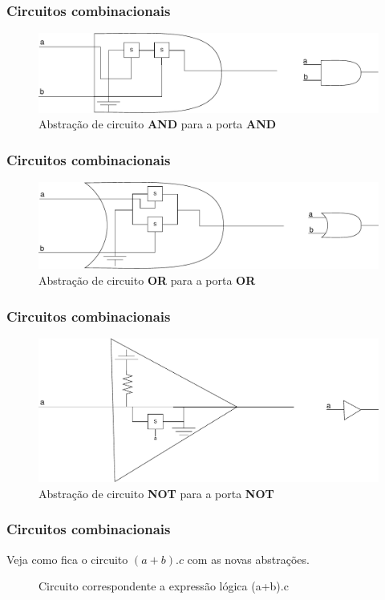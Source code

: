 \begin{frame}
	\frametitle{Circuitos combinacionais}
	\begin{figure}
		\centering
		\includegraphics[width=0.7\linewidth]{images/portaEAbstrata}
		\caption{Abstração de circuito \textbf{AND} para a porta \textbf{AND}}
		\label{fig:portaeabstrata}
	\end{figure}
\end{frame}

\begin{frame}
	\frametitle{Circuitos combinacionais}
	\begin{figure}
		\centering
		\includegraphics[width=0.7\linewidth]{images/portaOUAbstrata}
		\caption{Abstração de circuito \textbf{OR} para a porta \textbf{OR}}
		\label{fig:portaouabstrata}
	\end{figure}
\end{frame}

\begin{frame}
	\frametitle{Circuitos combinacionais}
	\begin{figure}
		\centering
		\includegraphics[width=0.7\linewidth]{images/portaNOTAbstrata}
		\caption{Abstração de circuito \textbf{NOT} para a porta \textbf{NOT}}
		\label{fig:portanotabstrata}
	\end{figure}
\end{frame}

\begin{frame}
	\frametitle{Circuitos combinacionais}
	\par Veja como fica o circuito $(a+b).c$ com as novas abstrações.
	\begin{figure}
		\centering
		
		\caption{Circuito correspondente a expressão lógica (a+b).c}
		\label{fig:circuitoAndOr}
	\end{figure}
\end{frame}
